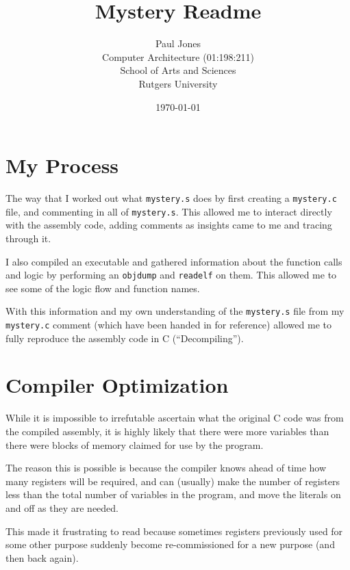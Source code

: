 \documentclass{article}
\title{Mystery Readme}
\date{\today}
\author{Paul Jones\\ Computer Architecture (01:198:211) \\ School of Arts and Sciences \\ Rutgers University}
\begin{document}
\maketitle


\section{My Process}

The way that I worked out what \texttt{mystery.s} does by first creating a \texttt{mystery.c}
file, and commenting in all of \texttt{mystery.s}. This allowed me to interact directly
with the assembly code, adding comments as insights came to me and tracing through it.

I also compiled an executable and gathered information about the function calls and 
logic by performing an \texttt{objdump} and \texttt{readelf} on them. This allowed me to
see some of the logic flow and function names.  

With this information and my own understanding of the \texttt{mystery.s} file from my
\texttt{mystery.c} comment (which have been handed in for reference) allowed me to
fully reproduce the assembly code in C (``Decompiling'').

\section{Compiler Optimization}

While it is impossible to irrefutable ascertain what the original C code was from the
compiled assembly, it is highly likely that there were more variables than there were
blocks of memory claimed for use by the program.

The reason this is possible is because the compiler knows ahead of time how many registers
will be required, and can (usually) make the number of registers less than the total number
of variables in the program, and move the literals on and off as they are needed.

This made it frustrating to read because sometimes registers previously used for some other
purpose suddenly become re-commissioned for a new purpose (and then back again).
\end{document}
